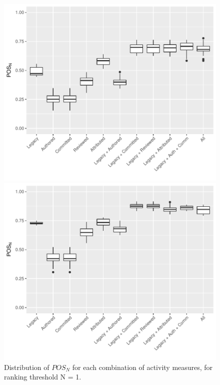  



\begin{figure}[t]
  \centering
  \begin{minipage}[b]{\columnwidth}
    \centering
    \includegraphics[scale=.55]{plots/RQ2_metrics_N1_one_maint}
    \caption{Distribution of $POS_N$ for each combination of activity measures, for ranking threshold N = 1. }
    \label{fig:rq2_1}
  \end{minipage}
  \begin{minipage}[b]{\columnwidth}
    \centering
    \includegraphics[scale=.55]{plots/RQ2_metrics_N3_one_maint}

\end{minipage}
\end{figure}
